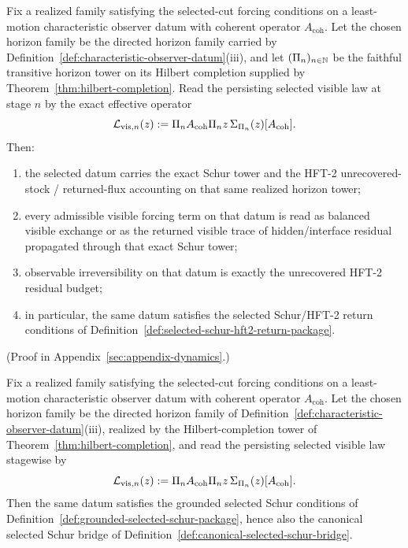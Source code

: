 \begin{theorem}
\label{thm:part-iii-realized-horizon-tower-forces-selected-schur-hft2-return-package}
Fix a realized family satisfying the selected-cut forcing conditions on a
least-motion characteristic observer datum with coherent operator
\(A_{\mathrm{coh}}\). Let the chosen horizon family be the directed horizon
family carried by Definition~\ref{def:characteristic-observer-datum}(iii), and
let \((\Pi_{n})_{n\in\mathbb{N}}\) be the faithful transitive horizon tower on its
Hilbert completion supplied by Theorem~\ref{thm:hilbert-completion}. Read the
persisting selected visible law at stage \(n\) by the exact effective operator
\[
\mathcal L_{\mathrm{vis},n}(z):=
\Pi_{n}A_{\mathrm{coh}}\Pi_{n}
 z\,\Sigma_{\Pi_{n}}(z)[A_{\mathrm{coh}}].
\]
Then:
\begin{enumerate}[label=(\alph*), leftmargin=2em, itemsep=0.2em]
\item the selected datum carries the exact Schur tower and the HFT-2
      unrecovered-stock / returned-flux accounting on that same realized
      horizon tower;
\item every admissible visible forcing term on that datum is read as balanced
      visible exchange or as the returned visible trace of hidden/interface
      residual propagated through that exact Schur tower;
\item observable irreversibility on that datum is exactly the unrecovered
      HFT-2 residual budget;
\item in particular, the same datum satisfies the selected Schur/HFT-2 return
      conditions of Definition~\ref{def:selected-schur-hft2-return-package}.
\end{enumerate}
\end{theorem}

(Proof in Appendix~\ref{sec:appendix-dynamics}.)

\begin{corollary}
\label{cor:temporal-realization-on-part-iii-horizon-tower-forces-grounded-selected-schur-package}
Fix a realized family satisfying the selected-cut forcing conditions on a
least-motion characteristic observer datum with coherent operator
\(A_{\mathrm{coh}}\). Let the chosen horizon family be the directed horizon
family of Definition~\ref{def:characteristic-observer-datum}(iii), realized by
the Hilbert-completion tower of Theorem~\ref{thm:hilbert-completion}, and read
the persisting selected visible law stagewise by
\[
\mathcal L_{\mathrm{vis},n}(z):=
\Pi_{n}A_{\mathrm{coh}}\Pi_{n}
 z\,\Sigma_{\Pi_{n}}(z)[A_{\mathrm{coh}}].
\]
Then the same datum satisfies the grounded selected Schur conditions of
Definition~\ref{def:grounded-selected-schur-package}, hence also the canonical
selected Schur bridge of Definition~\ref{def:canonical-selected-schur-bridge}.
\end{corollary}

